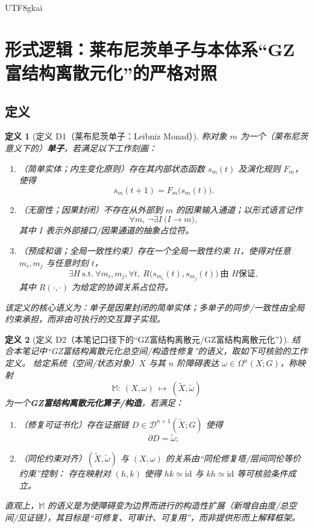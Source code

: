 \documentclass[12pt]{article}
\newtheorem{definition}{定义}[section]
\newcommand{\GZMonFull}{\texorpdfstring{GZ富结构离散元}{GZ富结构离散元}}
\newcommand{\GZMonization}{\texorpdfstring{GZ富结构离散元化}{GZ富结构离散元化}}
\begin{document}
\begin{CJK*}{UTF8}{gkai}
\clearpage

\section{形式逻辑：莱布尼茨单子与本体系“\GZMonization{}”的严格对照}
\label{sec:tex29-leibniz-monad-vs-monadization}
\label{sec:tex29-ch9}

\subsection{定义}
\label{subsec:tex29-leibniz-monad-vs-monadization-defs}

\begin{definition}[定义 D1（莱布尼茨单子：Leibniz Monad）]
\label{def:tex29-leibniz-monad}
称对象 $m$ 为一个（莱布尼茨意义下的）\textbf{单子}，若满足以下工作刻画：
\begin{enumerate}
  \item （简单实体；内生变化原则）存在其内部状态函数 $s_m(t)$ 及演化规则 $F_m$，使得
  \[
    s_m(t+1)=F_m\bigl(s_m(t)\bigr).
  \]
  \item （无窗性；因果封闭）不存在从外部到 $m$ 的因果输入通道；以形式语言记作
  \[
    \forall m,\ \neg\exists I\ \bigl(I\to m\bigr),
  \]
  其中 $I$ 表示外部接口/因果通道的抽象占位符。
  \item （预成和谐；全局一致性约束）存在一个全局一致性约束 $H$，使得对任意 $m_i,m_j$ 与任意时刻 $t$，
  \[
    \exists H\ \text{s.t.}\ \forall m_i,m_j,\forall t,\ R\bigl(s_{m_i}(t),s_{m_j}(t)\bigr)\ \text{由 }H\text{保证},
  \]
  其中 $R(\cdot,\cdot)$ 为给定的协调关系占位符。
\end{enumerate}
该定义的核心语义为：单子是因果封闭的简单实体；多单子的同步/一致性由全局约束承担，而非由可执行的交互算子实现。
\end{definition}

\begin{definition}[定义 D2（本笔记口径下的“\GZMonFull{}/\GZMonization{}”）]
\label{def:tex29-gframework-monadization}
结合本笔记中“\GZMonization{}总空间/构造性修复”的语义，取如下可核验的工作定义。
给定系统（空间/状态对象）$X$ 与其 $n$ 阶障碍表达 $\omega\in\Omega^n(X;G)$，称映射
\[
  \mathbb{M}:\ (X,\omega)\ \longmapsto\ (\widetilde{X},\widetilde{\omega})
\]
为一个\textbf{\GZMonization{}算子/构造}，若满足：
\begin{enumerate}
  \item （修复可证书化）存在证据链 $D\in\mathcal{D}^{n+1}(\widetilde{X};G)$ 使得
  \[
    \partial D=\widetilde{\omega};
  \]
  \item （同伦约束对齐）$(\widetilde{X},\widetilde{\omega})$ 与 $(X,\omega)$ 的关系由“同伦修复塔/层间同伦等价约束”控制：
  存在映射对 $(h,k)$ 使得 $hk\simeq \mathrm{id}$ 与 $kh\simeq \mathrm{id}$ 等可核验条件成立。
\end{enumerate}
直观上，$\mathbb{M}$ 的语义是\emph{为使障碍变为边界而进行的构造性扩展}（新增自由度/总空间/见证链），其目标是“可修复、可审计、可复用”，而非提供形而上解释框架。
\end{definition}


\end{CJK*}
\end{document}
